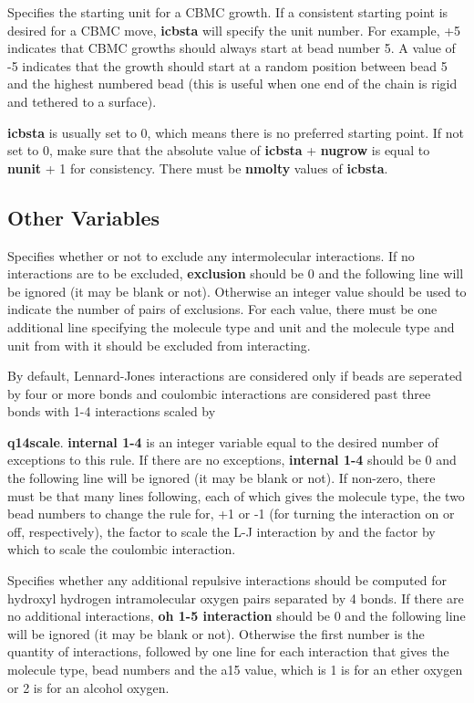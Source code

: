 \documentclass[12pt,letterpaper]{article}
\begin{document}
{{{{{ Specifies the starting unit for a CBMC growth.
If a consistent starting point is desired for a CBMC move, 
{\textbf {icbsta}} will specify the unit number.  
For example, +5 indicates that CBMC growths should always start at bead number 5.
A value of -5 indicates that the growth should start at
a random position between bead 5 and the highest numbered bead
(this is useful when one end of the chain is rigid and tethered to a surface). 
{\textbf{icbsta} is usually set to 0, which means there is no preferred starting point.
If not set to 0, make sure that the absolute value of {\textbf{icbsta}} +
{\textbf{nugrow}} is equal to {\textbf{nunit}} + 1 for consistency. 
There must be {\textbf{nmolty}} values of {\textbf {icbsta}}. 

\subsection{Other Variables}

 Specifies whether or not to exclude any
intermolecular interactions.  
If no interactions are to be excluded, {\textbf{exclusion}} should be 0 
and the following line will be ignored (it may be blank or not).
Otherwise an integer value should be used to indicate the number of pairs
of exclusions.  For each value, there must be one additional line
specifying the molecule type and unit and the molecule type and unit
from with it should be excluded from interacting.

 By default, Lennard-Jones interactions are
considered only if beads are seperated by four or more bonds and
coulombic interactions are considered past three bonds with 1-4
interactions scaled by {\textbf{q14scale}.  {\textbf{internal 1-4}} is an integer variable
equal to the desired number of exceptions to this rule.
If there are no exceptions, {\textbf{internal 1-4}} should be 0 and the following line 
will be ignored (it may be blank or not).
If non-zero, there must be that many lines following, 
each of which gives the molecule type, the two bead numbers to
change the rule for, +1 or -1 (for turning the interaction on or off,
respectively), the factor to scale the L-J interaction by and the
factor by which to scale the coulombic interaction.  

 Specifies whether any additional
repulsive interactions should be computed for hydroxyl hydrogen
intramolecular oxygen pairs separated by 4 bonds.  
If there are no additional interactions, {\textbf {oh 1-5 interaction}} should be 0 and the
following line will be ignored (it may be blank or not).
Otherwise the first number is the quantity of interactions, followed by one line for
each interaction that gives the molecule type, bead numbers and the a15 value,
which is 1 is for an ether oxygen or 2 is for an alcohol oxygen.

}}}}}}}
\end{document}
